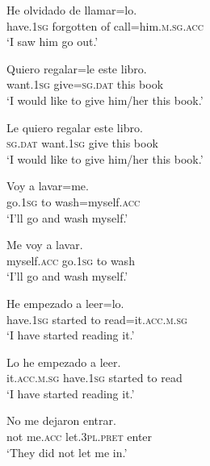 \documentclass[output=paper,modfonts,nonflat,newtxmath]{langsci/langscibook}
\begin{document}
\ea \label{ex:sciutti:22}
    \gll He olvidado de llamar=lo.\\
         have.\textsc{1sg} forgotten of call=him.\textsc{m.sg.acc} \\
    \glt  ‘I saw him go out.’
\z

\ea \label{ex:sciutti:23}
    \begin{xlist}
    \ex \label{ex:sciutti:23a}
    \gll Quiero regalar=le este libro.\\
         want.\textsc{1sg} give=\textsc{sg.dat} this  book\\
    \glt  ‘I would like to give him/her this book.’

    \ex \label{ex:sciutti:23b}
    \gll Le quiero regalar este libro.\\
         \textsc{sg.dat} want.\textsc{1sg} give this book\\
    \glt  ‘I would like to give him/her this book.’
    \end{xlist}
\z

\ea \label{ex:sciutti:24}
    \begin{xlist}
    \ex \label{ex:sciutti:24a}
    \gll Voy a lavar=me.\\
         go.\textsc{1sg} to wash=myself.\textsc{acc}\\
    \glt  ‘I’ll go and wash myself.’

    \ex \label{ex:sciutti:24b}
    \gll Me voy a lavar.\\
         myself.\textsc{acc} go.\textsc{1sg} to wash\\
    \glt  ‘I’ll go and wash myself.’
    \end{xlist}
\z


\ea \label{ex:sciutti:25}
    \begin{xlist}
    \ex \label{ex:sciutti:25a}
    \gll He empezado a leer=lo.\\
         have.\textsc{1sg} started to read=it.\textsc{acc.m.sg}\\
    \glt  ‘I have started reading it.’

    \ex \label{ex:sciutti:25b}
    \gll Lo he empezado a leer.\\
         it.\textsc{acc.m.sg} have.\textsc{1sg} started to read\\
    \glt  ‘I have started reading it.’
    \end{xlist}
\z

\ea \label{ex:sciutti:26}
    \gll No me dejaron entrar.\\
         not me.\textsc{acc} let.\textsc{3pl.pret} enter \\
    \glt  ‘They did not let me in.’
\z
\end{document}
